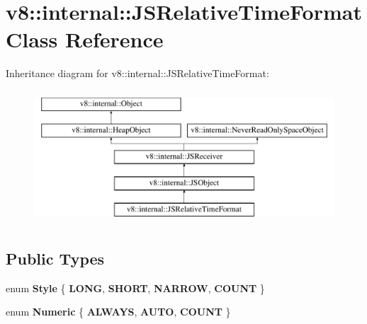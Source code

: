 \hypertarget{classv8_1_1internal_1_1JSRelativeTimeFormat}{}\section{v8\+:\+:internal\+:\+:J\+S\+Relative\+Time\+Format Class Reference}
\label{classv8_1_1internal_1_1JSRelativeTimeFormat}
Inheritance diagram for v8\+:\+:internal\+:\+:J\+S\+Relative\+Time\+Format\+:\begin{figure}[H]
\begin{center}
\leavevmode
\includegraphics[height=5.000000cm]{classv8_1_1internal_1_1JSRelativeTimeFormat}
\end{center}
\end{figure}
\subsection*{Public Types}
\begin{DoxyCompactItemize}
\item 
\mbox{\label{classv8_1_1internal_1_1JSRelativeTimeFormat_a143e799474e45193b9070b3fc95eb678}} 
enum {\bfseries Style} \{ {\bfseries L\+O\+NG}, 
{\bfseries S\+H\+O\+RT}, 
{\bfseries N\+A\+R\+R\+OW}, 
{\bfseries C\+O\+U\+NT}
 \}
\item 
\mbox{\label{classv8_1_1internal_1_1JSRelativeTimeFormat_aa677d92a6dc81d92c57494f259e47b3e}} 
enum {\bfseries Numeric} \{ {\bfseries A\+L\+W\+A\+YS}, 
{\bfseries A\+U\+TO}, 
{\bfseries C\+O\+U\+NT}
 \}
\end{DoxyCompactItemize}
